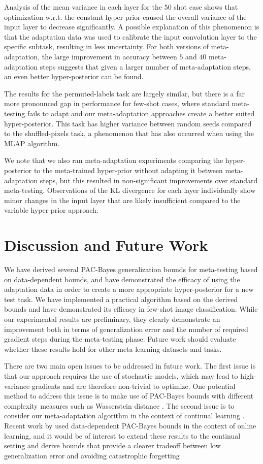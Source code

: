 \documentclass[letterpaper]{article} %
\theoremstyle{definition}
\begin{document}
Analysis of the mean variance in each layer for the $50$ shot case shows that optimization w.r.t.\! the constant hyper-prior caused the overall variance of the input layer to decrease significantly.
A possible explanation of this phenomenon is that the adaptation data was used to calibrate the input convolution layer to the specific subtask, resulting in less uncertainty.
For both versions of meta-adaptation, 
 the large improvement in accuracy between $5$ and $40$ meta-adaptation steps suggests that given a larger number of meta-adaptation steps, an even better hyper-posterior can be found.

The results for the permuted-labels task are largely similar, but there is a far more pronounced gap in performance for few-shot cases, where standard meta-testing fails to adapt and our meta-adaptation approaches create a better suited hyper-posterior. This task has higher variance between random seeds compared to the shuffled-pixels task, a phenomenon that has also occurred when using the MLAP \citep{Amit2018} algorithm.

We note that we also ran meta-adaptation experiments comparing the hyper-posterior to the meta-trained hyper-prior without adapting it between meta-adaptation steps, but this resulted in non-significant improvements over standard meta-testing. Observations of the KL divergence for each layer individually show minor changes in the input layer that are likely insufficient compared to the variable hyper-prior approach.

\section{Discussion and Future Work}

We have derived several PAC-Bayes generalization bounds for meta-testing based on data-dependent bounds, and have demonstrated the efficacy of using the adaptation data in order to create a more appropriate hyper-posterior for a new test task.
We have implemented a practical algorithm based on the derived bounds and have demonstrated its efficacy in few-shot image classification.
While our experimental results are preliminary, they clearly demonstrate an improvement both in terms of generalization error and the number of required gradient steps during the meta-testing phase. Future work should evaluate whether these results hold for other meta-learning datasets and tasks.

There are two main open issues to be addressed in future work. 
The first issue is that our approach requires the use of stochastic models, which may lead to high-variance gradients and are therefore non-trivial to optimize. One potential method to address this issue is to make use of PAC-Bayes bounds with different complexity measures such as Wasserstein distance \citep{Ohnishi2021, Amit2022}.
The second issue is to consider our meta-adaptation algorithm in the context of continual learning \citep{Kirkpatrick2017}. Recent work by \citet{Haddouche2022} used data-dependent PAC-Bayes bounds in the context of online learning, and it would be of interest to extend these results to the continual setting and derive bounds that provide a clearer tradeoff between low generalization error and avoiding catastrophic forgetting
\end{document}
